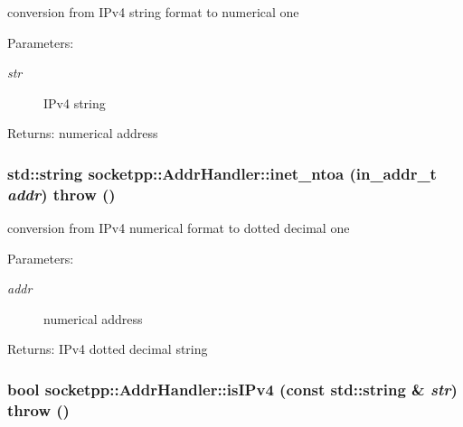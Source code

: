 conversion from IPv4 string format to numerical one 

\begin{Desc}
\item[Parameters:]
\begin{description}
\item[{\em str}]IPv4 string \end{description}
\end{Desc}
\begin{Desc}
\item[Returns:]numerical address \end{Desc}
\hypertarget{classsocketpp_1_1AddrHandler_a4377d84c8ea976aeada2b2eb0ac248d}{
\subsubsection[{inet\_\-ntoa}]{\setlength{\rightskip}{0pt plus 5cm}std::string socketpp::AddrHandler::inet\_\-ntoa (in\_\-addr\_\-t {\em addr})  throw ()}}
\label{classsocketpp_1_1AddrHandler_a4377d84c8ea976aeada2b2eb0ac248d}


conversion from IPv4 numerical format to dotted decimal one 

\begin{Desc}
\item[Parameters:]
\begin{description}
\item[{\em addr}]numerical address \end{description}
\end{Desc}
\begin{Desc}
\item[Returns:]IPv4 dotted decimal string \end{Desc}
\hypertarget{classsocketpp_1_1AddrHandler_652e24c273f7905cebf8d04b3cfef74d}{
\subsubsection[{isIPv4}]{\setlength{\rightskip}{0pt plus 5cm}bool socketpp::AddrHandler::isIPv4 (const std::string \& {\em str})  throw ()}}
\label{classsocketpp_1_1AddrHandler_652e24c273f7905cebf8d04b3cfef74d}


